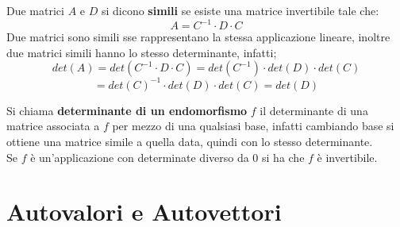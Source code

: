 \documentclass[a4paper,12pt, oneside]{book}
\begin{document}
\begin{definizione}
Due matrici $A$ e $D$ si dicono \textbf{simili} se esiste una matrice invertibile tale che:
$$A=C^{-1}\cdot D\cdot C$$
Due matrici sono simili sse rappresentano la stessa applicazione lineare, inoltre due matrici simili hanno lo stesso determinante, infatti;
$$det(A)=det(C^{-1}\cdot D\cdot C)=det(C^{-1})\cdot det(D)\cdot det(C)$$
$$=det(C)^{-1}\cdot det(D)\cdot det(C)=det(D)$$
\begin{shaded}
\begin{nota}
Si chiama \textbf{determinante di un endomorfismo} $f$ il determinante di una matrice associata a $f$ per mezzo di una qualsiasi base, infatti cambiando base si ottiene una matrice simile a quella data, quindi con lo stesso determinante.\\ Se $f$ è un'applicazione con determinate diverso da 0 si ha che $f$ è invertibile.
\end{nota}
\end{shaded}
\end{definizione}
\newpage
\section{Autovalori e Autovettori}
\end{document}
